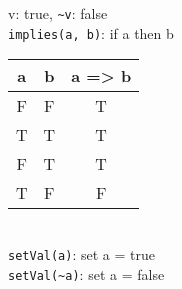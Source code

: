 
v: true, \lstinline{~v}: false \\

\lstinline{implies(a, b)}: if a then b \\
\begin{tabular}{ |c |c |c|  }
\hline 
a & b &  a => b \\
\hline 
F & F  &   T \\
T & T  &   T \\
F & T   &  T \\
T & F  &   F \\
\hline
\end{tabular} \\

\lstinline{setVal(a)}: set a = true \\
\lstinline{setVal(~a)}: set a = false \\